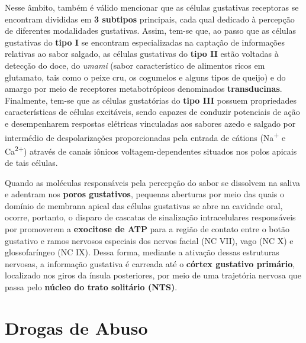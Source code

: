 \documentclass[
]{book}
\begin{document}
Nesse âmbito, também é válido mencionar que as células gustativas receptoras se encontram divididas em \textbf{3 subtipos} principais, cada qual dedicado à percepção de diferentes modalidades gustativas. Assim, tem-se que, ao passo que as células gustativas do \textbf{tipo I} se encontram especializadas na captação de informações relativas ao sabor salgado, as células gustativas do \textbf{tipo II} estão voltadas à detecção do doce, do \emph{umami} (sabor característico de alimentos ricos em glutamato, tais como o peixe cru, os cogumelos e alguns tipos de queijo) e do amargo por meio de receptores metabotrópicos denominados \textbf{transducinas}. Finalmente, tem-se que as células gustatórias do \textbf{tipo III} possuem propriedades características de células excitáveis, sendo capazes de conduzir potenciais de ação e desempenharem respostas elétricas vinculadas aos sabores azedo e salgado por intermédio de despolarizações proporcionadas pela entrada de cátions (Na\textsuperscript{+} e Ca\textsuperscript{2+}) através de canais iônicos voltagem-dependentes situados nos polos apicais de tais células.

Quando as moléculas responsáveis pela percepção do sabor se dissolvem na saliva e adentram nos \textbf{poros gustativos}, pequenas aberturas por meio das quais o domínio de membrana apical das células gustativas se abre na cavidade oral, ocorre, portanto, o disparo de cascatas de sinalização intracelulares responsáveis por promoverem a \textbf{exocitose de ATP} para a região de contato entre o botão gustativo e ramos nervosos especiais dos nervos facial (NC VII), vago (NC X) e glossofaríngeo (NC IX). Dessa forma, mediante a ativação dessas estruturas nervosas, a informação gustativa é carreada até o \textbf{córtex gustativo primário}, localizado nos giros da ínsula posteriores, por meio de uma trajetória nervosa que passa pelo \textbf{núcleo do trato solitário (NTS)}.

\hypertarget{drogas-de-abuso}{%
\chapter{Drogas de Abuso}\label{drogas-de-abuso}}
\end{document}
